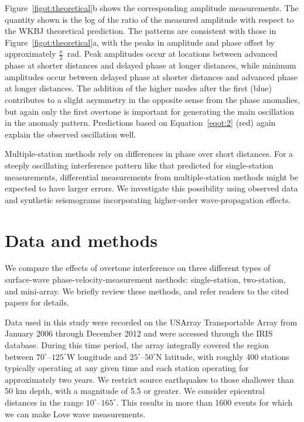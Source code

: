 \documentclass[12pt,oneside]{book}
\newcommand{\degree}[1]{\mbox{$#1^{\circ}$}}
\begin{document}
Figure~\ref{figot:theoretical}b shows the corresponding amplitude measurements. The quantity shown is the log of the ratio of the measured amplitude with respect to the WKBJ theoretical prediction. The patterns are consistent with those in Figure~\ref{figot:theoretical}a, with the peaks in amplitude and phase offset by approximately $\frac{\pi}{2}$~rad. Peak amplitudes occur at locations between advanced phase at shorter distances and delayed phase at longer distances, while minimum amplitudes occur between delayed phase at shorter distances and advanced phase at longer distances. The addition of the higher modes after the first (blue) contributes to a slight asymmetry in the opposite sense from the phase anomalies, but again only the first overtone is important for generating the main oscillation in the anomaly pattern. Predictions based on Equation~\ref{eqot:2} (red) again explain the observed oscillation well.

Multiple-station methods rely on differences in phase over short distances. For a steeply oscillating interference pattern like that predicted for single-station measurements, differential  measurements from multiple-station methods might be expected to have larger errors. We investigate this possibility using observed data and synthetic seismograms incorporating higher-order wave-propagation effects. 

\section{Data and methods}
We compare the effects of overtone interference on three different types of surface-wave phase-velocity-measurement methods: single-station, two-station, and mini-array. We briefly review these methods, and refer readers to the cited papers for details. 

Data used in this study were recorded on the USArray Transportable Array from January 2006 through December 2012 and were accessed through the IRIS database. During this time period, the array integrally covered the region between \degree{70}--\degree{125}W longitude and \degree{25}--\degree{50}N latitude, with roughly 400 stations typically operating at any given time and each station operating for approximately two years. We restrict source earthquakes to those shallower than 50 km depth, with a magnitude of 5.5 or greater. We consider epicentral distances in the range \degree{10}--\degree{165}. This results in more than 1600 events for which we can make Love wave measurements. 
\end{document}
